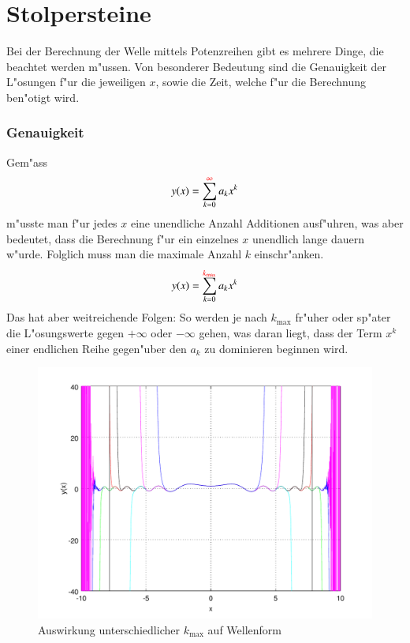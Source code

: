 \section{Stolpersteine}

Bei der Berechnung der Welle mittels Potenzreihen gibt es mehrere Dinge, die 
beachtet werden m"ussen. Von besonderer Bedeutung sind die Genauigkeit der 
L"osungen f"ur die jeweiligen $x$, sowie die Zeit, welche f"ur die 
Berechnung ben"otigt wird.

\subsubsection{Genauigkeit}
Gem"ass
\begin{equation*}
	y(x) = \sum_{k=0}^{\textcolor{red}{\infty}}a_kx^k
\end{equation*}
m"usste man f"ur jedes $x$ eine unendliche Anzahl Additionen ausf"uhren, was 
aber bedeutet, dass die Berechnung f"ur ein einzelnes $x$ unendlich lange 
dauern w"urde. Folglich muss man die maximale Anzahl $k$ einschr"anken.
\begin{equation*}
	y(x) = \sum_{k=0}^{\textcolor{red}{k_{\text{max}}}}a_kx^k
\end{equation*}
Das hat aber weitreichende Folgen: So werden je nach $k_{\text{max}}$ fr"uher 
oder sp"ater die L"osungswerte gegen $+\infty$ oder $-\infty$ gehen, was daran 
liegt, dass der Term $x^k$ einer endlichen Reihe gegen"uber den $a_k$ zu 
dominieren beginnen wird.

\begin{figure}
	\includegraphics[width=1\hsize]{./wellen/images/kmax/kmax.pdf}
	\caption{Auswirkung unterschiedlicher $k_{\text{max}}$ auf Wellenform}
	\label{fig:wellen:variablekmax}
\end{figure}

